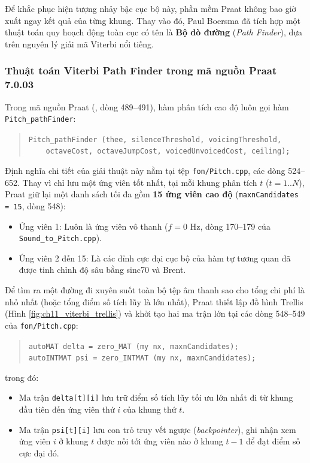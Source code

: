 Để khắc phục hiện tượng nhảy bậc cục bộ này, phần mềm Praat không bao giờ xuất ngay kết quả của từng khung. Thay vào đó, Paul Boersma đã tích hợp một thuật toán quy hoạch động toàn cục có tên là \textbf{Bộ dò đường} (\emph{Path Finder}), dựa trên nguyên lý giải mã Viterbi nổi tiếng.

\subsubsection*{Thuật toán Viterbi Path Finder trong mã nguồn Praat 7.0.03}
Trong mã nguồn Praat (, dòng 489--491),
hàm phân tích cao độ luôn gọi hàm \texttt{Pitch\_pathFinder}:
\begin{quote}
\small
\texttt{Pitch\_pathFinder (thee, silenceThreshold, voicingThreshold,}\\
\texttt{\ \ \ \ octaveCost, octaveJumpCost, voicedUnvoicedCost, ceiling);}
\end{quote}
Định nghĩa chi tiết của giải thuật này nằm tại tệp \texttt{fon/Pitch.cpp}, các dòng 524--652. Thay vì chỉ lưu một ứng viên tốt nhất, tại mỗi khung phân tích $t$ ($t = 1..N$), Praat giữ lại một danh sách tối đa gồm \textbf{15 ứng viên cao độ} (\texttt{maxnCandidates = 15}, dòng 548):
\begin{itemize}
    \item Ứng viên 1: Luôn là ứng viên vô thanh ($f = 0\text{ Hz}$, dòng 170--179 của \texttt{Sound\_to\_Pitch.cpp}).
    \item Ứng viên 2 đến 15: Là các đỉnh cực đại cục bộ của hàm tự tương quan đã được tinh chỉnh độ sâu bằng sinc70 và Brent.
\end{itemize}

Để tìm ra một đường đi xuyên suốt toàn bộ tệp âm thanh sao cho tổng chi phí là nhỏ nhất (hoặc tổng điểm số tích lũy là lớn nhất), Praat thiết lập đồ hình Trellis (Hình \ref{fig:ch11_viterbi_trellis}) và khởi tạo hai ma trận lớn tại các dòng 548--549 của \texttt{fon/Pitch.cpp}:
\begin{quote}
\small
\texttt{autoMAT delta = zero\_MAT (my nx, maxnCandidates);}\\
\texttt{autoINTMAT psi = zero\_INTMAT (my nx, maxnCandidates);}
\end{quote}
trong đó:
\begin{itemize}
    \item Ma trận \texttt{delta[t][i]} lưu trữ điểm số tích lũy tối ưu lớn nhất đi từ khung đầu tiên đến ứng viên thứ $i$ của khung thứ $t$.
    \item Ma trận \texttt{psi[t][i]} lưu con trỏ truy vết ngược (\emph{backpointer}), ghi nhận xem ứng viên $i$ ở khung $t$ được nối tới ứng viên nào ở khung $t-1$ để đạt điểm số cực đại đó.
\end{itemize}

